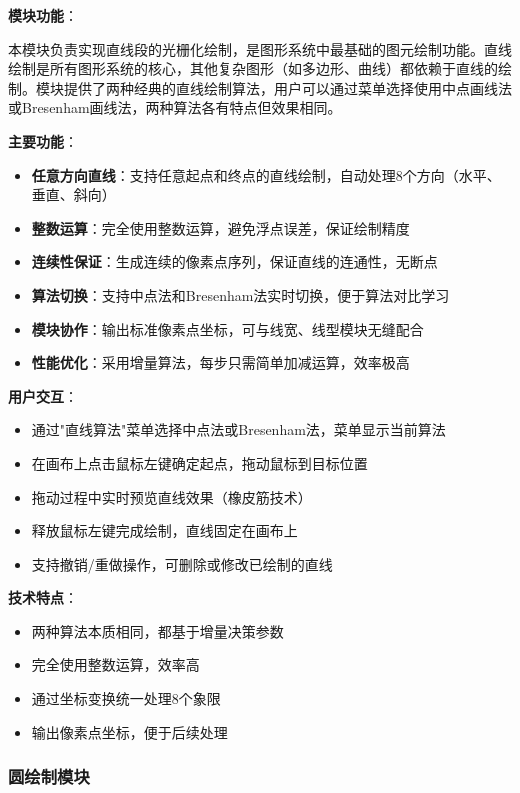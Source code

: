 \documentclass[12pt,a4paper]{article}
\begin{document}
\begin{tcolorbox}
\textbf{模块功能}：

本模块负责实现直线段的光栅化绘制，是图形系统中最基础的图元绘制功能。直线绘制是所有图形系统的核心，其他复杂图形（如多边形、曲线）都依赖于直线的绘制。模块提供了两种经典的直线绘制算法，用户可以通过菜单选择使用中点画线法或Bresenham画线法，两种算法各有特点但效果相同。

\textbf{主要功能}：
\begin{itemize}
    \item \textbf{任意方向直线}：支持任意起点和终点的直线绘制，自动处理8个方向（水平、垂直、斜向）
    \item \textbf{整数运算}：完全使用整数运算，避免浮点误差，保证绘制精度
    \item \textbf{连续性保证}：生成连续的像素点序列，保证直线的连通性，无断点
    \item \textbf{算法切换}：支持中点法和Bresenham法实时切换，便于算法对比学习
    \item \textbf{模块协作}：输出标准像素点坐标，可与线宽、线型模块无缝配合
    \item \textbf{性能优化}：采用增量算法，每步只需简单加减运算，效率极高
\end{itemize}

\textbf{用户交互}：
\begin{itemize}
    \item 通过"直线算法"菜单选择中点法或Bresenham法，菜单显示当前算法
    \item 在画布上点击鼠标左键确定起点，拖动鼠标到目标位置
    \item 拖动过程中实时预览直线效果（橡皮筋技术）
    \item 释放鼠标左键完成绘制，直线固定在画布上
    \item 支持撤销/重做操作，可删除或修改已绘制的直线
\end{itemize}

\textbf{技术特点}：
\begin{itemize}
    \item 两种算法本质相同，都基于增量决策参数
    \item 完全使用整数运算，效率高
    \item 通过坐标变换统一处理8个象限
    \item 输出像素点坐标，便于后续处理
\end{itemize}
\end{tcolorbox}

\subsubsection{圆绘制模块}
\end{document}
